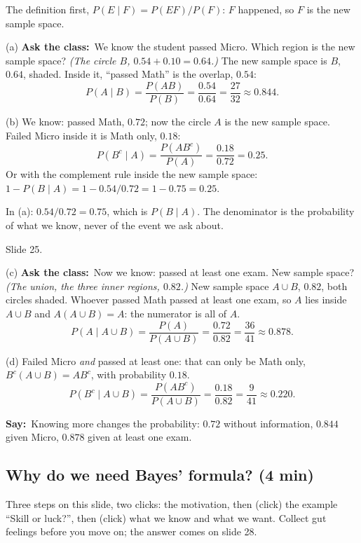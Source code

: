 \documentclass[11pt,a4paper,parskip=half]{scrartcl}
\newcommand{\say}{\textbf{\color{teal}Say:}\ }
\newcommand{\ask}{\textbf{\color{navy}Ask the class:}\ }
\begin{document}
The definition first, $P(E\mid F)=P(EF)/P(F)$: $F$ happened, so $F$ is the
new sample space.

(a) \ask We know the student passed Micro. Which region is the new
sample space? \emph{(The circle $B$, $0.54+0.10=0.64$.)} The new sample
space is $B$, $0.64$, shaded. Inside it, ``passed Math'' is the overlap,
$0.54$:
\[ P(A\mid B)=\frac{P(AB)}{P(B)}=\frac{0.54}{0.64}=\frac{27}{32}\approx0.844. \]

(b) We know: passed Math, $0.72$; now the circle $A$ is the new sample
space. Failed Micro inside it is Math only, $0.18$:
\[ P(B^c\mid A)=\frac{P(AB^c)}{P(A)}=\frac{0.18}{0.72}=0.25. \]
Or with the complement rule inside the new sample space:
$1-P(B\mid A)=1-0.54/0.72=1-0.75=0.25$.

\begin{mistake}
	In (a): $0.54/0.72=0.75$, which is $P(B\mid A)$. The denominator is the
	probability of what we know, never of the event we ask about.
\end{mistake}

\begin{slidecue}
	Slide 25.
\end{slidecue}

(c) \ask Now we know: passed at least one exam. New sample space? \emph{(The
union, the three inner regions, $0.82$.)} New sample space $A\cup B$,
$0.82$, both circles shaded. Whoever passed Math passed at least one exam,
so $A$ lies inside $A\cup B$ and $A(A\cup B)=A$: the numerator is all of
$A$.
\[ P(A\mid A\cup B)=\frac{P(A)}{P(A\cup B)}=\frac{0.72}{0.82}=\frac{36}{41}
	\approx0.878. \]

(d) Failed Micro \emph{and} passed at least one: that can only be Math
only, $B^c(A\cup B)=AB^c$, with probability $0.18$.
\[ P(B^c\mid A\cup B)=\frac{P(AB^c)}{P(A\cup B)}=\frac{0.18}{0.82}
	=\frac{9}{41}\approx0.220. \]

\say Knowing more changes the probability: $0.72$ without information,
$0.844$ given Micro, $0.878$ given at least one exam.

\subsection{Why do we need Bayes' formula? (4 min)}

\begin{slidecue}
	Three steps on this slide, two clicks: the motivation, then (click) the
	example ``Skill or luck?'', then (click) what we know and what we want.
	Collect gut feelings before you move on; the answer comes on slide 28.
\end{slidecue}
\end{document}
